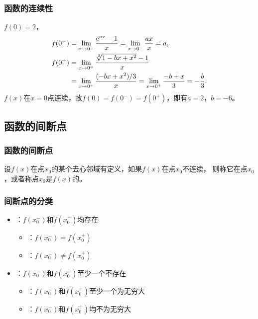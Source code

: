 \documentclass[14pt,notheorems,leqno,xcolor={rgb}]{beamer} %
\begin{document}
\begin{sframe}
\frametitle{函数的连续性}
\begin{solution}
$f(0)=2$，
\begin{align*}
f(0^-)&=\lim\limits_{x\to0^-}\dfrac{\mathrm{e}^{ax}-1}{x}=\lim\limits_{x\to0^-}\dfrac{ax}{x}=a,\\
f(0^+)&=\lim\limits_{x\to0^+}\dfrac{\sqrt[3]{1-bx+x^2}-1}{x}\\
&=\lim\limits_{x\to0^+}\dfrac{(-bx+x^2)/3}{x}=\lim\limits_{x\to0^+}\dfrac{-b+x}{3}=-\frac{b}3.
\end{align*}
$f(x)$在$x=0$点连续，故$f(0)=f(0^-)=f(0^+)$，即有$a=2$，$b=-6$。
\end{solution}
\end{sframe}

\subsection{函数的间断点}

\begin{frame}
\frametitle{函数的间断点}
\begin{definition*}
设$f(x)$在点$x_0$的某个去心邻域有定义，如果$f(x)$在点$x_0$不连续，
则称它在点$x_0$ ，或者称点$x_0$是$f(x)$的。
\end{definition*}
\end{frame}

\begin{frame}
\frametitle{间断点的分类}
\begin{itemize}[<+->]
  \item {}：$f(x_0^-)$和$f(x_0^+)$均存在
  \begin{itemize}
    \item {}：$f(x_0^-)=f(x_0^+)$
    \item {}：$f(x_0^-)\neq f(x_0^+)$
  \end{itemize}
  \item {}：$f(x_0^-)$和$f(x_0^+)$至少一个不存在
  \begin{itemize}
    \item {}：$f(x_0^-)$和$f(x_0^+)$至少一个为无穷大
    \item {}：$f(x_0^-)$和$f(x_0^+)$均不为无穷大
  \end{itemize}
\end{itemize}
\end{frame}
\end{document}
